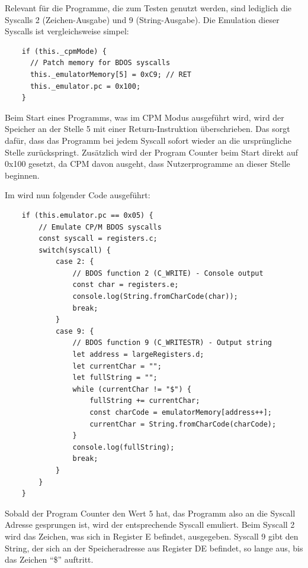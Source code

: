 Relevant für die Programme, die zum Testen genutzt werden, sind lediglich die Syscalls 2 (Zeichen-Ausgabe) und 9 (String-Ausgabe). Die Emulation dieser Syscalls ist vergleichsweise simpel:

\begin{verbatim}
    if (this._cpmMode) {
      // Patch memory for BDOS syscalls
      this._emulatorMemory[5] = 0xC9; // RET
      this._emulator.pc = 0x100;
    }
\end{verbatim}

Beim Start eines Programms, was im \ac{CPM} Modus ausgeführt wird, wird der Speicher an der Stelle 5 mit einer Return-Instruktion überschrieben. Das sorgt dafür, dass das Programm bei jedem Syscall sofort wieder an die ursprüngliche Stelle zurückspringt. Zusätzlich wird der Program Counter beim Start direkt auf 0x100 gesetzt, da \ac{CPM} davon ausgeht, dass Nutzerprogramme an dieser Stelle beginnen.

Im  wird nun folgender Code ausgeführt:

\begin{verbatim}
    if (this.emulator.pc == 0x05) {
        // Emulate CP/M BDOS syscalls
        const syscall = registers.c;
        switch(syscall) {
            case 2: {
                // BDOS function 2 (C_WRITE) - Console output
                const char = registers.e;
                console.log(String.fromCharCode(char));
                break;
            }
            case 9: {
                // BDOS function 9 (C_WRITESTR) - Output string
                let address = largeRegisters.d;
                let currentChar = "";
                let fullString = "";
                while (currentChar != "$") {
                    fullString += currentChar;
                    const charCode = emulatorMemory[address++];
                    currentChar = String.fromCharCode(charCode);
                }
                console.log(fullString);
                break;
            }
        }
    }
\end{verbatim}

Sobald der Program Counter den Wert 5 hat, das Programm also an die Syscall Adresse gesprungen ist, wird der entsprechende Syscall emuliert. Beim Syscall 2 wird das Zeichen, was sich in Register E befindet, ausgegeben. Syscall 9 gibt den String, der sich an der Speicheradresse aus Register DE befindet, so lange aus, bis das Zeichen \enquote{\$} auftritt.